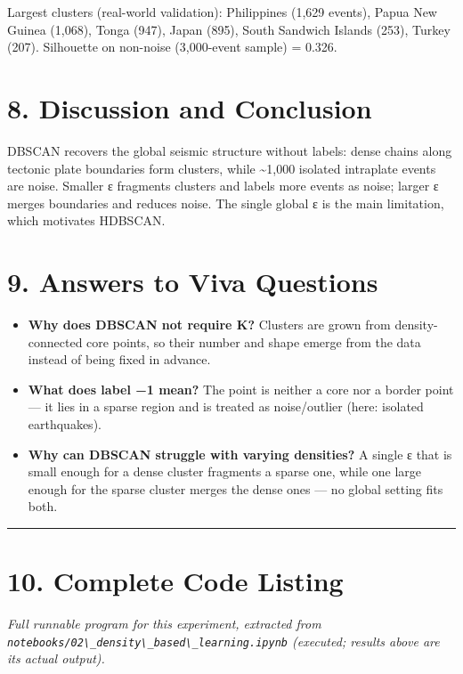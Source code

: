 Largest clusters (real-world validation): Philippines (1,629 events),
Papua New Guinea (1,068), Tonga (947), Japan (895), South Sandwich
Islands (253), Turkey (207). Silhouette on non-noise (3,000-event
sample) = 0.326.

\section{8. Discussion and Conclusion}\label{discussion-and-conclusion}

DBSCAN recovers the global seismic structure without labels: dense
chains along tectonic plate boundaries form clusters, while
\textasciitilde1,000 isolated intraplate events are noise. Smaller ε
fragments clusters and labels more events as noise; larger ε merges
boundaries and reduces noise. The single global ε is the main
limitation, which motivates HDBSCAN.

\section{9. Answers to Viva Questions}\label{answers-to-viva-questions}

\begin{itemize}
\tightlist
\item
  \textbf{Why does DBSCAN not require K?} Clusters are grown from
  density-connected core points, so their number and shape emerge from
  the data instead of being fixed in advance.
\item
  \textbf{What does label −1 mean?} The point is neither a core nor a
  border point --- it lies in a sparse region and is treated as
  noise/outlier (here: isolated earthquakes).
\item
  \textbf{Why can DBSCAN struggle with varying densities?} A single ε
  that is small enough for a dense cluster fragments a sparse one, while
  one large enough for the sparse cluster merges the dense ones --- no
  global setting fits both.
\end{itemize}

\begin{center}\rule{0.5\linewidth}{0.5pt}\end{center}

\section{10. Complete Code Listing}\label{complete-code-listing}

\emph{Full runnable program for this experiment, extracted from
\passthrough{\lstinline!notebooks/02\_density\_based\_learning.ipynb!}
(executed; results above are its actual output).}

